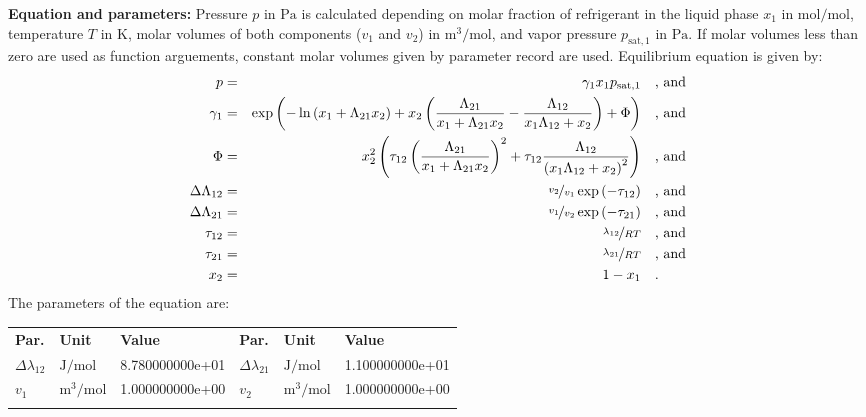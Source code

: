 \textbf{Equation and parameters:}
\newline
%
Pressure $p$ in $\si{\pascal}$ is calculated depending on molar fraction of refrigerant in the liquid phase $x_1$ in $\si{\mole\per\mole}$, temperature $T$ in $\si{\kelvin}$, molar volumes of both components ($v_1$ and $v_2$) in $\si{\cubic\meter\per\mole}$, and vapor pressure $p_\mathrm{sat,1}$ in $\si{\pascal}$. If molar volumes less than zero are used as function arguements, constant molar volumes given by parameter record are used. Equilibrium equation is given by:
%
\begin{equation*}
\begin{split}
p &=& \gamma_1 x_1 p_\mathrm{sat,1} & \quad\text{, and} \\
\gamma_1 &=& \exp \left( - \ln \left( x_1 + \Lambda_{21} x_2 \right) + x_2 \left( \frac{\Lambda_{21}}{x_1 + \Lambda_{21} x_2} - \frac{\Lambda_{12}}{x_1 \Lambda_{12} + x_2} \right) + \Phi \right) & \quad\text{, and} \\
\Phi &=& x_2^2 \left( \tau_{12} \left( \frac{\Lambda_{21}}{x_1 + \Lambda_{21} x_2} \right) ^2 + \tau_{12} \frac{\Lambda_{12}}{\left( x_1 \Lambda_{12} + x_2 \right) ^2}  \right) & \quad\text{, and} \\
\Delta\Lambda_{12} &=& \nicefrac{v_2}{v_1} \exp \left( - \tau_{12} \right) & \quad\text{, and} \\
\Delta\Lambda_{21} &=& \nicefrac{v_1}{v_2} \exp \left( - \tau_{21} \right) & \quad\text{, and} \\
\tau_{12} &=& \nicefrac{\lambda_{12}}{R T} & \quad\text{, and} \\
\tau_{21} &=& \nicefrac{\lambda_{21}}{R T} & \quad\text{, and} \\
x_2 &=& 1 - x_1  & \quad\text{.} \\
\end{split}
\end{equation*}
%
The parameters of the equation are:
%
\begin{longtable}[l]{lll|lll}
\toprule
\addlinespace
\textbf{Par.} & \textbf{Unit} & \textbf{Value} &	\textbf{Par.} & \textbf{Unit} & \textbf{Value} \\
\addlinespace
\midrule
\endhead

\bottomrule
\endfoot
\bottomrule
\endlastfoot
\addlinespace

$\Delta\lambda_{12}$ & $\si{\joule\per\mole}$ & 8.780000000e+01 & $\Delta\lambda_{21}$ & $\si{\joule\per\mole}$ & 1.100000000e+01 \\
$v_1$ & $\si{\cubic\meter\per\mole}$ & 1.000000000e+00 & $v_2$ & $\si{\cubic\meter\per\mole}$ & 1.000000000e+00 \\

\addlinespace\end{longtable}

